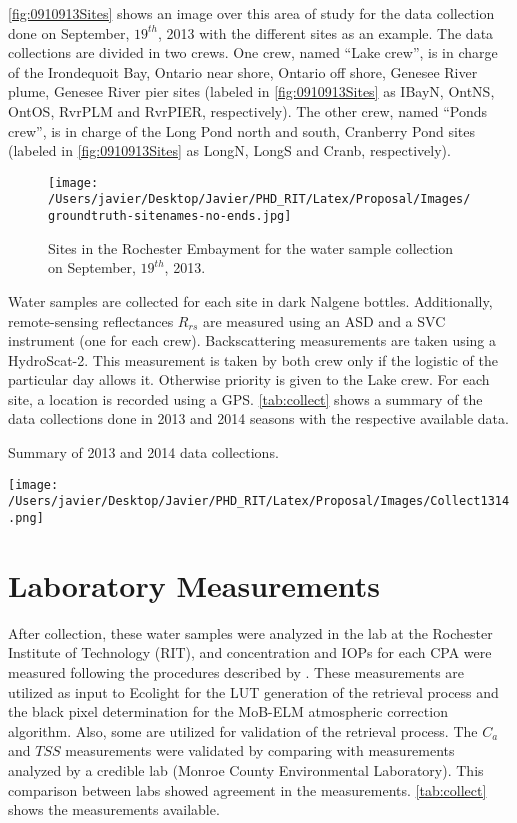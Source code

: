 \autoref{fig:0910913Sites} shows an image over this area of study for the data collection done on September, $19^{th}$, 2013  with the different sites as an example. The data collections are divided in two crews. One crew, named ``Lake crew'', is in charge of the Irondequoit Bay, Ontario near shore, Ontario off shore, Genesee River plume, Genesee River pier sites (labeled in \autoref{fig:0910913Sites} as IBayN, OntNS, OntOS, RvrPLM and RvrPIER, respectively). The other crew, named ``Ponds crew'', is in charge of the Long Pond north and south, Cranberry Pond sites (labeled in \autoref{fig:0910913Sites} as LongN, LongS and Cranb, respectively).

\begin{figure}[htb]
  \centering
  \texttt{[image: /Users/javier/Desktop/Javier/PHD\_RIT/Latex/Proposal/Images/groundtruth-sitenames-no-ends.jpg]}
  \caption{Sites in the Rochester Embayment for the water sample collection on September, $19^{th}$, 2013.\label{fig:0910913Sites} } 
\end{figure}

Water samples are collected for each site in dark Nalgene bottles. Additionally, remote-sensing reflectances $R_{rs}$ are measured using an ASD and a SVC instrument (one for each crew). Backscattering measurements are taken using a HydroScat-2. This measurement is taken by both crew only if the logistic of the particular day allows it. Otherwise priority is given to the Lake crew. For each site, a location is recorded using a GPS. \autoref{tab:collect} shows a summary of the data collections done in 2013 and 2014 seasons with the respective available data.

\begin{table}[htb]
  \caption{Summary of 2013 and 2014 data collections.}
  \centering
  \texttt{[image: /Users/javier/Desktop/Javier/PHD\_RIT/Latex/Proposal/Images/Collect1314.png]}
  \label{tab:collect}
\end{table}

\section{Laboratory Measurements}

After collection, these water samples were analyzed in the lab at the Rochester Institute of Technology (RIT), and concentration and IOPs for each CPA were measured following the procedures described by \cite{Mueller1995}. These measurements are utilized as input to Ecolight for the LUT generation of the retrieval process and the black pixel determination for the MoB-ELM atmospheric correction algorithm. Also, some are utilized for validation of the retrieval process. The $C_a$ and $TSS$ measurements were validated by comparing with measurements analyzed by a credible lab (Monroe County Environmental Laboratory). This comparison between labs showed agreement in the measurements. \autoref{tab:collect} shows the measurements available.

